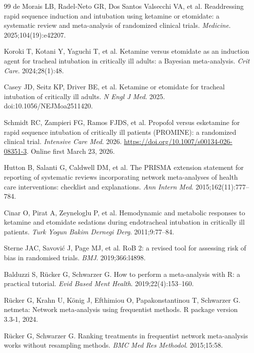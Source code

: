 \documentclass[11pt]{article}
\begin{document}
\begin{thebibliography}{99}
de Morais LB, Radel-Neto GR, Dos Santos Valsecchi VA, et al.
Readdressing rapid sequence induction and intubation using ketamine or etomidate: a systematic review and meta-analysis of randomized clinical trials.
\textit{Medicine}. 2025;104(19):e42207.

Koroki T, Kotani Y, Yaguchi T, et al.
Ketamine versus etomidate as an induction agent for tracheal intubation in critically ill adults: a Bayesian meta-analysis.
\textit{Crit Care}. 2024;28(1):48.

Casey JD, Seitz KP, Driver BE, et al.
Ketamine or etomidate for tracheal intubation of critically ill adults.
\textit{N Engl J Med}. 2025. doi:10.1056/NEJMoa2511420.

Schmidt RC, Zampieri FG, Ramos FJDS, et al.
Propofol versus esketamine for rapid sequence intubation of critically ill patients (PROMINE): a randomized clinical trial.
\textit{Intensive Care Med}. 2026. \url{https://doi.org/10.1007/s00134-026-08351-3}. Online first March 23, 2026.

Hutton B, Salanti G, Caldwell DM, et al.
The PRISMA extension statement for reporting of systematic reviews incorporating network meta-analyses of health care interventions: checklist and explanations.
\textit{Ann Intern Med}. 2015;162(11):777--784.

Cinar O, Pirat A, Zeyneloglu P, et al.
Hemodynamic and metabolic responses to ketamine and etomidate sedations during endotracheal intubation in critically ill patients.
\textit{Turk Yogun Bakim Dernegi Derg}. 2011;9:77--84.

Sterne JAC, Savovi\'c J, Page MJ, et al.
RoB 2: a revised tool for assessing risk of bias in randomised trials.
\textit{BMJ}. 2019;366:l4898.

Balduzzi S, R\"ucker G, Schwarzer G.
How to perform a meta-analysis with R: a practical tutorial.
\textit{Evid Based Ment Health}. 2019;22(4):153--160.

R\"ucker G, Krahn U, K\"onig J, Efthimiou O, Papakonstantinou T, Schwarzer G.
netmeta: Network meta-analysis using frequentist methods.
R package version 3.3-1, 2024.

R\"ucker G, Schwarzer G.
Ranking treatments in frequentist network meta-analysis works without resampling methods.
\textit{BMC Med Res Methodol}. 2015;15:58.


\end{thebibliography}
\end{document}
